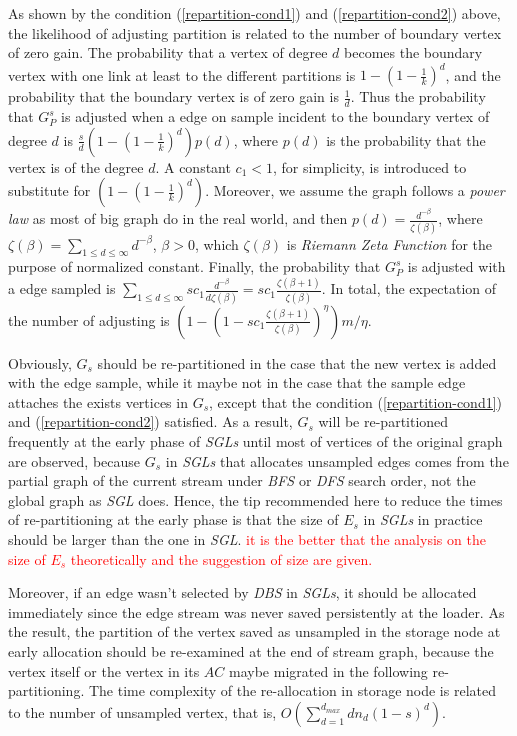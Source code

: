 \documentclass{sig-alternate-2013}
\begin{document}
As shown by the condition (\ref{repartition-cond1}) and  (\ref{repartition-cond2}) above, the likelihood of adjusting partition is related to the number of boundary vertex of zero gain.
The probability that a vertex of degree $d$ becomes the boundary vertex with one link at least to the different partitions is  $1-(1-\frac{1}{k})^d$, and the probability that the boundary vertex is of zero gain is $\frac{1}{d}$. Thus the probability that $G_P^s$ is  adjusted when a edge on sample incident to the boundary vertex of degree $d$ is $\frac{s}{d}(1-(1-\frac{1}{k})^d) p(d)$, where $p(d)$ is the probability that the vertex is of the degree $d$.  A constant $c_1<1$, for  simplicity,  is introduced to substitute for $(1-(1-\frac{1}{k})^d)$. Moreover,  we assume the graph follows a \textit{power law} as most of big graph do in the real world, and then $p(d)=\frac{d^{-\beta}}{\zeta (\beta)}$, where $\zeta (\beta) = \sum_{1\leq d \leq \infty} {d^{-\beta}}$, $\beta > 0$, which $\zeta (\beta)$ is \textit{Riemann Zeta Function} for the purpose of normalized constant. Finally, the probability that $G_P^s$ is  adjusted with a edge sampled is $ \sum_{1\leq d \leq \infty} {s c_1 } \frac{d^{-\beta}}{d \zeta (\beta)}= s c_1\frac{\zeta(\beta+1)}{\zeta (\beta)}$.
In total, the expectation of the number of adjusting is
$(1-(1-s c_1\frac{\zeta(\beta+1)}{\zeta (\beta)})^{\eta}) m/\eta$.

Obviously, $G_s$ should be re-partitioned in the case that the new vertex is added with the edge sample, while it maybe not in the case that the sample edge attaches the exists vertices in $G_s$, except that the condition (\ref{repartition-cond1}) and  (\ref{repartition-cond2}) satisfied. As a result, $G_s$  will be re-partitioned frequently at the early phase of \textit{SGLs} until most of vertices of the original graph are observed, because $G_s$ in \textit{SGLs} that allocates unsampled edges comes from the partial graph of the current stream under \textit{BFS} or \textit{DFS} search order, not the global graph as \textit{SGL} does.
Hence, the tip recommended here to reduce the times of re-partitioning at the early phase is that the size of $E_s$ in \textit{SGLs} in practice should be larger than the one in \textit{SGL}.
\textcolor{red}{it is the better that the analysis on the size of $E_s$ theoretically and the suggestion of size are given.}

Moreover,
if an edge wasn't selected by \textit{DBS} in \textit{SGLs}, it should be allocated immediately since the edge stream was never saved persistently at the loader.
As the result, the partition of the vertex saved as unsampled in the storage node at early allocation should be re-examined at the end of stream graph, because the vertex itself or the vertex in its $AC$ maybe migrated in the following re-partitioning.
The time complexity of the re-allocation in storage node is related to the number of unsampled vertex, that is, $O(\sum_{d=1}^{d_{max}} {d n_d(1-s)^d})$.
\end{document}
